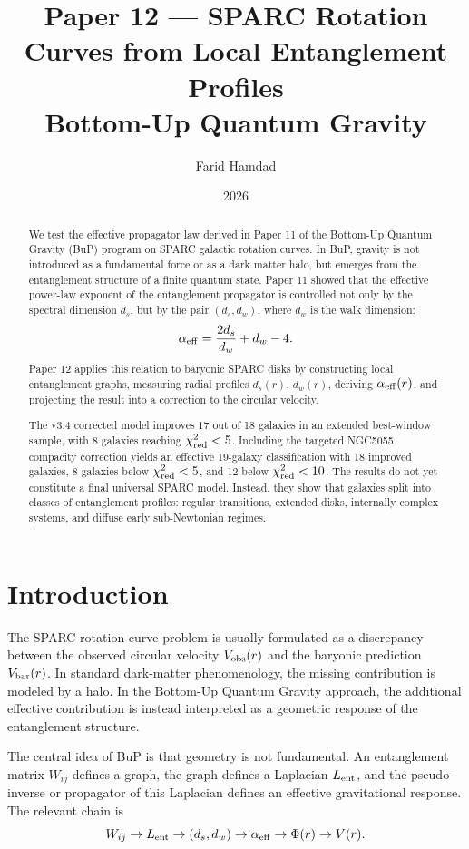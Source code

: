 \documentclass[11pt,a4paper]{article}
\title{
Paper 12 --- SPARC Rotation Curves from Local Entanglement Profiles\\
\large Bottom-Up Quantum Gravity
}
\author{Farid Hamdad}
\date{2026}
\begin{document}
\maketitle

\begin{abstract}
We test the effective propagator law derived in Paper 11 of the Bottom-Up
Quantum Gravity (BuP) program on SPARC galactic rotation curves. In BuP,
gravity is not introduced as a fundamental force or as a dark matter halo, but
emerges from the entanglement structure of a finite quantum state. Paper 11
showed that the effective power-law exponent of the entanglement propagator is
controlled not only by the spectral dimension \(d_s\), but by the pair
\((d_s,d_w)\), where \(d_w\) is the walk dimension:
\[
\alpha_{\rm eff}
=
\frac{2d_s}{d_w}+d_w-4.
\]
Paper 12 applies this relation to baryonic SPARC disks by constructing local
entanglement graphs, measuring radial profiles \(d_s(r)\), \(d_w(r)\), deriving
\(\alpha_{\rm eff}(r)\), and projecting the result into a correction to the
circular velocity.

The v3.4 corrected model improves 17 out of 18 galaxies in an extended
best-window sample, with 8 galaxies reaching \(\chi^2_{\rm red}<5\). Including
the targeted NGC5055 compacity correction yields an effective 19-galaxy
classification with 18 improved galaxies, 8 galaxies below
\(\chi^2_{\rm red}<5\), and 12 below \(\chi^2_{\rm red}<10\). The results do
not yet constitute a final universal SPARC model. Instead, they show that
galaxies split into classes of entanglement profiles: regular transitions,
extended disks, internally complex systems, and diffuse early sub-Newtonian
regimes.
\end{abstract}

\section{Introduction}

The SPARC rotation-curve problem is usually formulated as a discrepancy between
the observed circular velocity \(V_{\rm obs}(r)\) and the baryonic prediction
\(V_{\rm bar}(r)\). In standard dark-matter phenomenology, the missing
contribution is modeled by a halo. In the Bottom-Up Quantum Gravity approach,
the additional effective contribution is instead interpreted as a geometric
response of the entanglement structure.

The central idea of BuP is that geometry is not fundamental. An entanglement
matrix \(W_{ij}\) defines a graph, the graph defines a Laplacian
\(L_{\rm ent}\), and the pseudo-inverse or propagator of this Laplacian defines
an effective gravitational response. The relevant chain is
\[
W_{ij}
\rightarrow
L_{\rm ent}
\rightarrow
(d_s,d_w)
\rightarrow
\alpha_{\rm eff}
\rightarrow
\Phi(r)
\rightarrow
V(r).
\]
\end{document}
